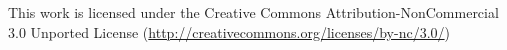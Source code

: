 %
%
%
%


\newpage

\pagestyle{empty}

		\noindent
		This work is licensed under the Creative Commons Attribution-NonCommercial 3.0 Unported License (\href{http://creativecommons.org/licenses/by-nc/3.0/}{http://creativecommons.org/licenses/by-nc/3.0/}) 



 

